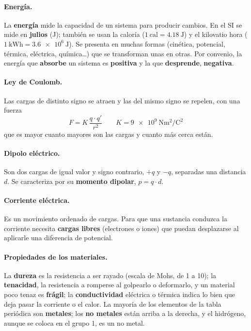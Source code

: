 \paragraph{Energía.} La \textbf{energía} mide la capacidad de un sistema para producir cambios. En el SI se mide en
\textbf{julios} (J); también se usan la caloría (\(1~\mathrm{cal} = \qty{4.18}{\joule}\)) y el kilovatio hora
(\(\qty{1}{\kilo\watt\hour} = \qty{3.6e6}{\joule}\)). Se presenta en muchas formas (cinética, potencial, térmica, eléctrica,
química…) que se transforman unas en otras. Por convenio, la energía que \textbf{absorbe} un sistema es \textbf{positiva} y la que
\textbf{desprende}, \textbf{negativa}.

\paragraph{Ley de Coulomb.} Las cargas de distinto signo se atraen y las del mismo signo se repelen, con una fuerza
\[ F = K \, \frac{q \cdot q'}{r^2} \qquad K = \qty{9e9}{\newton\m\squared\per\coulomb\squared} \]
que es mayor cuanto mayores son las cargas y cuanto más cerca están.

\paragraph{Dipolo eléctrico.} Son dos cargas de igual valor y signo contrario, \(+q\) y \(-q\), separadas una distancia \(d\).
Se caracteriza por su \textbf{momento dipolar}, \(p = q \cdot d\).

\paragraph{Corriente eléctrica.} Es un movimiento ordenado de cargas. Para que una sustancia conduzca la corriente necesita
\textbf{cargas libres} (electrones o iones) que puedan desplazarse al aplicarle una diferencia de potencial.

\paragraph{Propiedades de los materiales.} La \textbf{dureza} es la resistencia a ser rayado (escala de Mohs, de 1 a 10); la
\textbf{tenacidad}, la resistencia a romperse al golpearlo o deformarlo, y un material poco tenaz es \textbf{frágil}; la
\textbf{conductividad} eléctrica o térmica indica lo bien que deja pasar la corriente o el calor. La mayoría de los elementos de
la tabla periódica son \textbf{metales}; los \textbf{no metales} están arriba a la derecha, y el hidrógeno, aunque se coloca en el
grupo 1, es un no metal.

